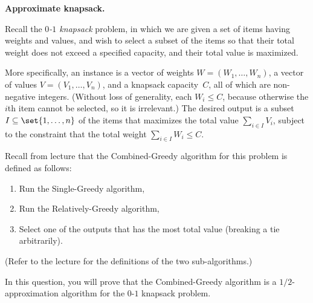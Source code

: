 \documentclass[11pt,addpoints]{exam}
\begin{document}
\begin{questions}
  \begin{solution}
    
  \end{solution}

  \question \textbf{Approximate knapsack.}
  
  Recall the \emph{$0$-$1$ knapsack} problem, in which we are given a set of items having weights and values, and wish to select a subset of the items so that their total weight does not exceed a specified capacity, and their total value is maximized.

  More specifically, an instance is a vector of weights $W=(W_{1}, \ldots, W_{n})$, a vector of values $V=(V_{1},\ldots, V_{n})$, and a knapsack capacity~$C$, all of which are non-negative integers.
  (Without loss of generality, each $W_{i} \leq C$, because otherwise the $i$th item cannot be selected, so it is irrelevant.)
  The desired output is a subset $I \subseteq \set{1,\ldots,n}$ of the items that maximizes the total value $\sum_{i \in I} V_{i}$, subject to the constraint that the total weight $\sum_{i \in I} W_{i} \leq C$.

  Recall from lecture that the Combined-Greedy algorithm for this problem is defined as follows:
  \begin{enumerate}
  \item Run the Single-Greedy algorithm,
  \item Run the Relatively-Greedy algorithm,
  \item Select one of the outputs that has the most total value
    (breaking a tie arbitrarily).
  \end{enumerate}
  (Refer to the lecture for the definitions of the two sub-algorithms.)

  In this question, you will prove that the Combined-Greedy algorithm is a $1/2$-approximation algorithm for the $0$-$1$ knapsack problem.

\end{questions}
\end{document}
